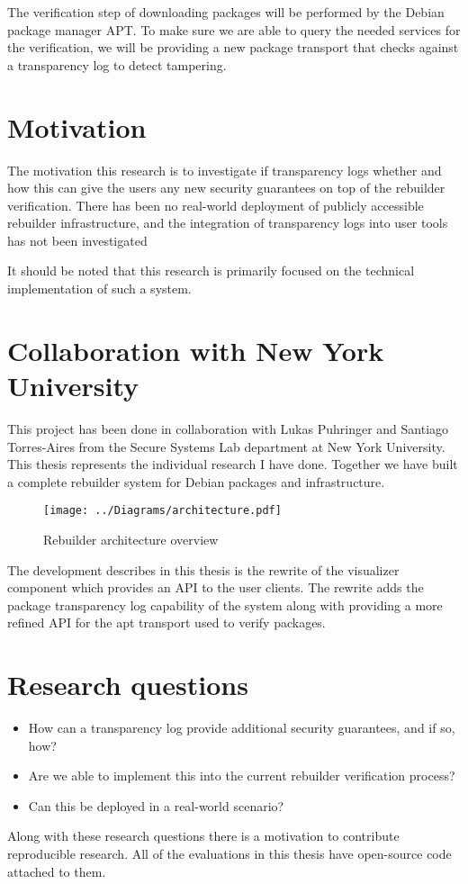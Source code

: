 \documentclass[../Main/thesis.tex]{subfiles}
\begin{document}
The verification step of downloading packages will be performed by the Debian
package manager APT. To make sure we are able to query the needed services for
the verification, we will be providing a new package transport that checks
against a transparency log to detect tampering.

\section{Motivation}\label{sec:motivation}
The motivation this research is to investigate if transparency logs whether and
how this can give the users any new security guarantees on top of the rebuilder
verification. There has been no real-world deployment of publicly accessible
rebuilder infrastructure, and the integration of transparency logs into user
tools has not been investigated 

It should be noted that this research is primarily focused on the technical
implementation of such a system.

\section{Collaboration with New York University}\label{sec:collab}
This project has been done in collaboration with Lukas Puhringer and Santiago
Torres-Aires from the Secure Systems Lab department at New York University. This
thesis represents the individual research I have done. Together we have built a
complete rebuilder system for Debian packages and infrastructure. 

\begin{figure}[H]
\centering
\texttt{[image: ../Diagrams/architecture.pdf]}
\caption{Rebuilder architecture overview}
\label{fig:rebuilder_architecture}
\end{figure}

The development describes in this thesis is the rewrite of the visualizer
component which provides an API to the user clients. The rewrite adds the
package transparency log capability of the system along with providing a more
refined API for the apt transport used to verify packages.

\section{Research questions}\label{sec:rq}

\begin{itemize}
    \item How can a transparency log provide additional security guarantees, and
        if so, how?
    \item Are we able to implement this into the current rebuilder verification
        process?
    \item Can this be deployed in a real-world scenario?
\end{itemize}

Along with these research questions there is a motivation to contribute
reproducible research. All of the evaluations in this thesis have open-source
code attached to them.

\blankpage
\end{document}
